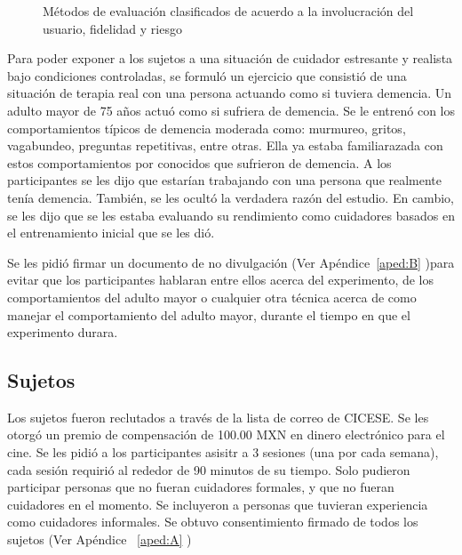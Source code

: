 \begin{figure}[h]
        \centering
        \caption{M\'etodos de evaluaci\'on clasificados de acuerdo a la involucraci\'on del usuario, fidelidad y riesgo}\label{fig:evalmethods}
\end{figure}


Para poder exponer a los sujetos a una situaci\'on de cuidador estresante y realista bajo condiciones controladas, se formul\'o un ejercicio que consisti\'o de una situaci\'on de terapia real con una persona actuando como si tuviera demencia. Un adulto mayor de 75 a\~nos actu\'o como si sufriera de demencia. Se le entren\'o con los comportamientos t\'ipicos de demencia moderada como: murmureo, gritos, vagabundeo, preguntas repetitivas, entre otras. Ella ya estaba familiarazada con estos comportamientos por conocidos que sufrieron de demencia. A los participantes se les dijo que estar\'ian trabajando con una persona que realmente ten\'ia demencia. Tambi\'en, se les ocult\'o la verdadera raz\'on del estudio. En cambio, se les dijo que se les estaba evaluando su rendimiento como cuidadores basados en el entrenamiento inicial que se les di\'o.

Se les pidi\'o firmar un documento de no divulgaci\'on (Ver Ap\'endice~\ref{aped:B} )para evitar que los participantes hablaran entre ellos acerca del experimento, de los comportamientos del adulto mayor o cualquier otra t\'ecnica acerca de como manejar el comportamiento del adulto mayor, durante el tiempo en que el experimento durara.

\subsection{Sujetos}\label{secc:subjects}
Los sujetos fueron reclutados a trav\'es de la lista de correo de CICESE. Se les otorg\'o un premio de compensaci\'on de 100.00 MXN en dinero electr\'onico para el cine. Se les pidi\'o a los participantes asisitr a 3 sesiones (una por cada semana), cada sesi\'on requiri\'o al rededor de 90 minutos de su tiempo. Solo pudieron participar personas que no fueran cuidadores formales, y que no fueran cuidadores en el momento. Se incluyeron a personas que tuvieran experiencia como cuidadores informales. Se obtuvo consentimiento firmado de todos los sujetos (Ver Ap\'endice ~\ref{aped:A} )

